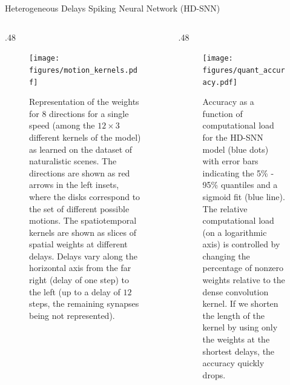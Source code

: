 \documentclass[final]{beamer}
\newlength{\colwidth}
\begin{document}
\begin{frame}[t]
\begin{columns}[t]
\begin{column}{\colwidth}
\begin{block}{Heterogeneous Delays Spiking Neural Network (HD-SNN)~\textcite{Grimaldi23BC}}
\begin{columns}[t]
\begin{column}{.48\colwidth}

\begin{figure}
    {\centering
    \texttt{[image: figures/motion\_kernels.pdf]}
    }
    \caption{
    	Representation of the weights for $8$ directions for a single speed (among the $12 \times 3$ different kernels of the model) as learned on the dataset of naturalistic scenes. The directions are shown as red arrows in the left insets, where the disks correspond to the set of different possible motions. The spatiotemporal kernels are shown as slices of spatial weights at different delays. Delays vary along the horizontal axis from the far right (delay of one step) to the left (up to a delay of $12$ steps, the remaining synapses being not represented). %
	}
    \label{fig:kernels}
\end{figure} 
\end{column}
%
\begin{column}{.48\colwidth}
\begin{figure}%
    \centering
    \texttt{[image: figures/quant\_accuracy.pdf]}
    \caption{
        Accuracy as a function of computational load for the HD-SNN model (blue dots) with error bars indicating the 5\% - 95\% quantiles and a sigmoid fit (blue line). The relative computational load (on a logarithmic axis) is controlled by changing the percentage of nonzero weights relative to the dense convolution kernel. If we shorten the length of the kernel by using only the weights at the shortest delays, the accuracy quickly drops. %
        }
    \label{fig:accuracy}
\end{figure}
\end{column}
\end{columns}


\end{block}
\end{column}
\end{columns}
\end{frame}
\end{document}
